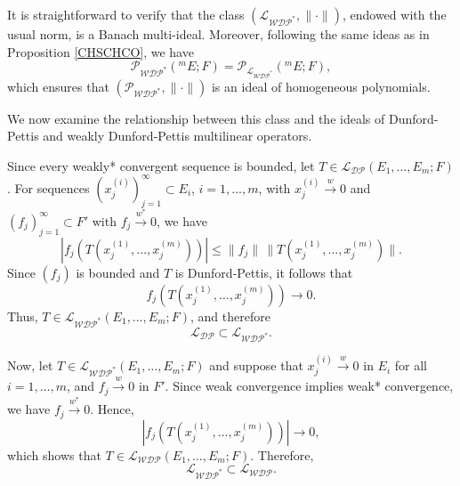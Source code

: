 \documentclass[12 pt]{article}%
\newtheorem{final remark}[theorem]{Final Remark}
\begin{document}
It is straightforward to verify that the class $\left(\mathcal{L_{WDP^{*}}}, \|\cdot\|\right)$, endowed with the usual norm, is a Banach multi-ideal. Moreover, following the same ideas as in Proposition \ref{CHSCHCO}, we have
\begin{equation*}
	\mathcal{P_{WDP^{*}}}(^mE; F) = \mathcal{P}_{\mathcal{L_{WDP^{*}}}}(^mE; F),
\end{equation*}
which ensures that $\left(\mathcal{P_{WDP^{*}}}, \|\cdot\|\right)$ is an ideal of homogeneous polynomials.

We now examine the relationship between this class and the ideals of Dunford-Pettis and weakly Dunford-Pettis multilinear operators.

Since every weakly* convergent sequence is bounded, let $T \in \mathcal{L_{DP}}(E_1,\dots, E_m; F)$. For sequences $(x_j^{(i)})_{j=1}^{\infty} \subset E_i$, $i=1,\dots, m$, with $x_j^{(i)} \overset{w}{\longrightarrow} 0$ and $(f_j)_{j=1}^{\infty} \subset F'$ with $f_j \overset{w^{*}}{\longrightarrow} 0$, we have
\begin{equation*}
	|f_j(T(x_j^{(1)},\dots, x_j^{(m)}))| \le \|f_j\| \, \|T(x_j^{(1)},\dots, x_j^{(m)})\|.
\end{equation*}
Since $(f_j)$ is bounded and $T$ is Dunford-Pettis, it follows that
\begin{equation*}
	f_j(T(x_j^{(1)},\dots, x_j^{(m)})) \longrightarrow 0.
\end{equation*}
Thus, $T \in \mathcal{L_{WDP^{*}}}(E_1,\dots, E_m; F)$, and therefore
\begin{equation*}
	\mathcal{L_{DP}} \subset \mathcal{L_{WDP^{*}}}.
\end{equation*}

Now, let $T \in \mathcal{L_{WDP^{*}}}(E_1,\dots, E_m; F)$ and suppose that $x_j^{(i)} \overset{w}{\longrightarrow} 0$ in $E_i$ for all $i=1,\dots, m$, and $f_j \overset{w}{\longrightarrow} 0$ in $F'$. Since weak convergence implies weak* convergence, we have $f_j \overset{w^{*}}{\longrightarrow} 0$. Hence,
\begin{equation*}
	|f_j(T(x_j^{(1)},\dots, x_j^{(m)}))| \longrightarrow 0,
\end{equation*}
which shows that $T \in \mathcal{L_{WDP}}(E_1,\dots, E_m; F)$. Therefore,
\begin{equation*}
	\mathcal{L_{WDP^{*}}} \subset \mathcal{L_{WDP}}.
\end{equation*}


\end{document}
